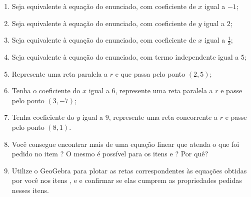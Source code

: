 \documentclass[10 pt,usenames,dvipsnames, oneside]{article}
\begin{document}
\begin{enumerate}
\item{}
Seja equivalente à equação do enunciado, com coeficiente de $x$ igual a $-1$;

\item{}
Seja equivalente à equação do enunciado, com coeficiente de $y$ igual a $2$;

\item{}
Seja equivalente à equação do enunciado, com coeficiente de $x$ igual a $\frac{1}{3}$;

\item{}
Seja equivalente à equação do enunciado, com termo independente igual a $5$;

\item{}
Represente uma reta paralela a $r$ e que passa pelo ponto $(2,5)$;

\item{}
Tenha o coeficiente do $x$ igual a $6$, represente uma reta paralela a $r$ e passe pelo ponto $(3,-7)$;

\item{}
Tenha coeficiente do $y$ igual a $9$, represente uma reta concorrente a $r$ e passe pelo ponto $(8,1)$.

\item{}	
Você consegue encontrar mais de uma equação linear que atenda o que foi pedido no item ? O mesmo é possível para os itens  e ? Por quê?

\item{}
Utilize o GeoGebra para plotar as retas correspondentes às equações obtidas por você nos itens ,  e  e confirmar se elas cumprem as propriedades pedidas nesses itens.
\end{enumerate}
\end{document}
